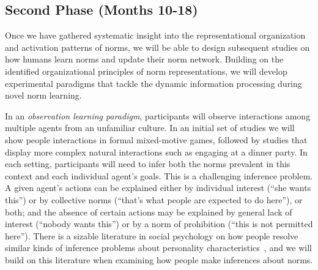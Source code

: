 \documentclass[12pt]{article}
\begin{document}

\subsection*{Second Phase (Months  10-18)}

Once we have gathered systematic insight into the representational
organization and activation patterns of norms, we will be able to
design subsequent studies on how humans learn norms and update their
norm network.  Building on the identified organizational principles of
norm representations, we will develop experimental paradigms that
tackle the dynamic information processing during novel norm learning.

In an {\em observation learning paradigm}, participants will observe
interactions among multiple agents from an unfamiliar culture.  In an
initial set of studies we will show people interactions in formal
mixed-motive games, followed by studies that display more complex
natural interactions such as engaging at a dinner party.  In each
setting, participants will need to infer both the norms prevalent in
this context and each individual agent's goals.  This is a challenging
inference problem.  A given agent's actions can be explained either by
individual interest (``she wants this'') or by collective norms
(``that's what people are expected to do here''), or both; and the
absence of certain actions may be explained by general lack of
interest (``nobody wants this'') or by a norm of prohibition (``this
is not permitted here'').
There is a sizable literature in social psychology on how people
resolve similar kinds of inference problems about personality
characteristics~\citep{jones65,kelley67}, and we will build on
this literature when examining how people make inferences about norms.
\end{document}
